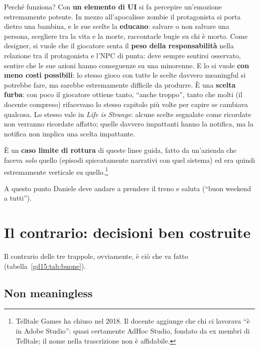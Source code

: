 Perché funziona? Con \textbf{un elemento di UI} si fa percepire un'emozione
estremamente potente. In mezzo all'apocalisse zombie il protagonista si porta
dietro una bambina, e le sue scelte la \textbf{educano}: salvare o non
salvare una persona, scegliere tra la vita e la morte, raccontarle bugie su
chi è morto. Come designer, si vuole che il giocatore senta il \textbf{peso
della responsabilità} nella relazione tra il protagonista e l'NPC di punta:
deve sempre sentirsi osservato, sentire che le sue azioni hanno conseguenze
su una minorenne. E lo si vuole \textbf{con meno costi possibili}: lo stesso
gioco con tutte le scelte davvero meaningful si potrebbe fare, ma sarebbe
estremamente difficile da produrre. È una \textbf{scelta furba}: con poco il
giocatore ottiene tanto, ``anche troppo'', tanto che molti (il docente
compreso) rifacevano lo stesso capitolo più volte per capire se cambiava
qualcosa. Lo stesso vale in \emph{Life is Strange}: alcune scelte segnalate
come ricordate non verranno ricordate affatto; quelle davvero impattanti
hanno la notifica, ma la notifica non implica una scelta impattante.

È un \textbf{caso limite di rottura} di queste linee guida, fatto da
un'azienda che faceva \emph{solo} quello (episodi spiccatamente narrativi con
quel sistema) ed era quindi estremamente verticale su
quello.\footnote{Telltale Games ha chiuso nel 2018. Il docente aggiunge che
chi ci lavorava ``è in Adobe Studio'': quasi certamente AdHoc Studio, fondato
da ex membri di Telltale; il nome nella trascrizione non è affidabile.}

A questo punto Daniele deve andare a prendere il treno e saluta (``buon
weekend a tutti'').

\section{Il contrario: decisioni ben costruite}
\label{gd15:sec:buone}



Il contrario delle tre trappole, ovviamente, è ciò che va fatto
(tabella~\ref{gd15:tab:buone}).

\subsection{Non meaningless}

